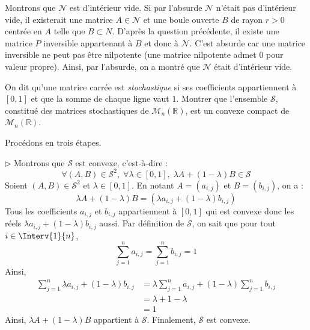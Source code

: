 \documentclass[a4paper,10pt]{report}
\begin{document}
\begin{enumerate}
\begin{enumerate}
\medskip

\noindent Montrons que $\mathcal{N}$ est d'intérieur vide. Si par l'absurde $\mathcal{N}$ n'était pas d'intérieur vide, il existerait une matrice $A \in \mathcal{N}$ et une boule ouverte $B$ de rayon $r>0$ centrée en $A$ telle que $B \subset N$. D'après la question précédente, il existe une matrice $P$ inversible appartenant à $B$ et donc à $\mathcal{N}$. C'est absurde car une matrice inversible ne peut pas être nilpotente (une matrice nilpotente admet $0$ pour valeur propre). Ainsi, par l'absurde, on a montré que $\mathcal{N}$ était d'intérieur vide.
\end{enumerate}
\end{enumerate}


\begin{Exa} On dit qu'une matrice carrée est \textit{stochastique} si ses coefficients appartiennent à $[0,1]$ et que la somme de chaque ligne vaut $1$. Montrer que l'ensemble $\mathcal{S}$, constitué des matrices stochastiques de $\mathcal{M}_n(\mathbb{R})$, est un convexe compact de $\mathcal{M}_n(\mathbb{R})$.
\end{Exa} 

\corr Procédons en trois étapes.

\medskip

\noindent $\rhd$ Montrons que $\mathcal{S}$ est convexe, c'est-à-dire :
$$ \forall (A,B) \in \mathcal{S}^2, \; \forall \lambda \in [0,1], \; \lambda A+(1-\lambda)B \in \mathcal{S}$$
Soient $(A,B) \in \mathcal{S}^2$ et $\lambda \in [0,1]$. En notant $A=(a_{i,j})$ et $B=(b_{i,j})$, on a :
$$ \lambda A+ (1- \lambda) B = (\lambda a_{i,j} + (1- \lambda) b_{i,j})$$
Tous les coefficients $a_{i,j}$ et $ b_{i,j}$ appartiennent à $[0,1]$ qui est convexe donc les réels $\lambda a_{i,j} + (1- \lambda) b_{i,j}$ aussi. Par définition de $\mathcal{S}$, on sait que pour tout $i \in \Interv{1}{n}$,
$$ \sum_{j=1}^n a_{i,j} = \sum_{j=1}^n b_{i,j} = 1$$
Ainsi,
\begin{align*}
\sum_{j=1}^n \lambda a_{i,j} + (1 - \lambda) b_{i,j} & = \lambda   \sum_{j=1}^n a_{i,j} + (1 - \lambda)  \sum_{j=1}^n b_{i,j}  \\
& = \lambda + 1- \lambda \\
& = 1
\end{align*}
Ainsi, $\lambda A+ (1- \lambda)B$ appartient à $\mathcal{S}$. Finalement, $\mathcal{S}$ est convexe.

\medskip
\end{document}
